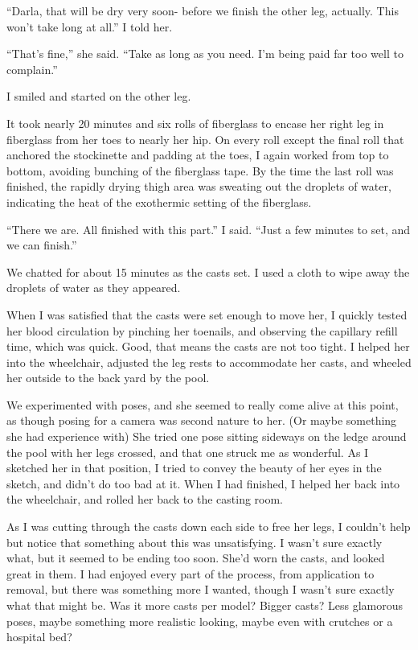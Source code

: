 ``Darla, that will be dry very soon- before we finish the other leg, actually. This won't
take long at all.'' I told her.

``That's fine,'' she said. ``Take as long as you need. I'm being paid far too well to
complain.''

I smiled and started on the other leg.

It took nearly 20 minutes and six rolls of fiberglass to encase her right leg in fiberglass
from her toes to nearly her hip. On every roll except the final roll that anchored the
stockinette and padding at the toes, I again worked from top to bottom, avoiding bunching of the
fiberglass tape. By the time the last roll was finished, the rapidly drying thigh area was
sweating out the droplets of water, indicating the heat of the exothermic setting of the
fiberglass.

``There we are. All finished with this part.'' I said. ``Just a few minutes to set, and we
can finish.''

We chatted for about 15 minutes as the casts set. I used a cloth to wipe away the droplets
of water as they appeared.

When I was satisfied that the casts were set enough to move her, I quickly tested her blood
circulation by pinching her toenails, and observing the capillary refill time, which was quick.
Good, that means the casts are not too tight. I helped her into the wheelchair, adjusted the leg
rests to accommodate her casts, and wheeled her outside to the back yard by the pool.

We experimented with poses, and she seemed to really come alive at this point, as though
posing for a camera was second nature to her. (Or maybe something she had experience with) She
tried one pose sitting sideways on the ledge around the pool with her legs crossed, and that one
struck me as wonderful. As I sketched her in that position, I tried to convey the beauty of her
eyes in the sketch, and didn't do too bad at it. When I had finished, I helped her back into the
wheelchair, and rolled her back to the casting room.

As I was cutting through the casts down each side to free her legs, I couldn't help but
notice that something about this was unsatisfying. I wasn't sure exactly what, but it seemed to
be ending too soon. She'd worn the casts, and looked great in them. I had enjoyed every part of
the process, from application to removal, but there was something more I wanted, though I wasn't
sure exactly what that might be. Was it more casts per model? Bigger casts? Less glamorous
poses, maybe something more realistic looking, maybe even with crutches or a hospital bed?

